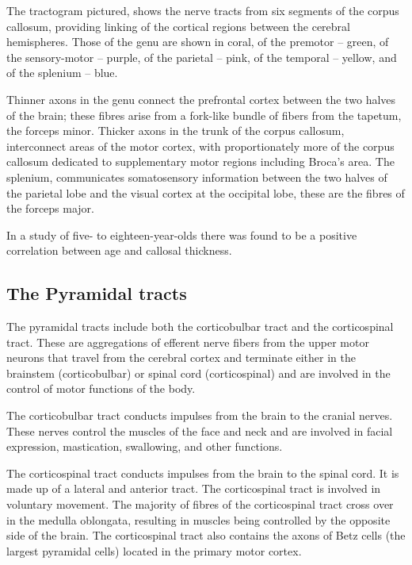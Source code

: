 \documentclass[]{book}
\begin{document}
The tractogram pictured, shows the nerve tracts from six segments of the corpus callosum, providing linking of the cortical regions between the cerebral hemispheres. Those of the genu are shown in coral, of the premotor -- green, of the sensory-motor -- purple, of the parietal -- pink, of the temporal -- yellow, and of the splenium -- blue.

Thinner axons in the genu connect the prefrontal cortex between the two halves of the brain; these fibres arise from a fork-like bundle of fibers from the tapetum, the forceps minor. Thicker axons in the trunk of the corpus callosum, interconnect areas of the motor cortex, with proportionately more of the corpus callosum dedicated to supplementary motor regions including Broca's area. The splenium, communicates somatosensory information between the two halves of the parietal lobe and the visual cortex at the occipital lobe, these are the fibres of the forceps major.

In a study of five- to eighteen-year-olds there was found to be a positive correlation between age and callosal thickness.

\hypertarget{the-pyramidal-tracts}{%
\subsection{The Pyramidal tracts}\label{the-pyramidal-tracts}}

The pyramidal tracts include both the corticobulbar tract and the corticospinal tract. These are aggregations of efferent nerve fibers from the upper motor neurons that travel from the cerebral cortex and terminate either in the brainstem (corticobulbar) or spinal cord (corticospinal) and are involved in the control of motor functions of the body.

The corticobulbar tract conducts impulses from the brain to the cranial nerves. These nerves control the muscles of the face and neck and are involved in facial expression, mastication, swallowing, and other functions.

The corticospinal tract conducts impulses from the brain to the spinal cord. It is made up of a lateral and anterior tract. The corticospinal tract is involved in voluntary movement. The majority of fibres of the corticospinal tract cross over in the medulla oblongata, resulting in muscles being controlled by the opposite side of the brain. The corticospinal tract also contains the axons of Betz cells (the largest pyramidal cells) located in the primary motor cortex.
\end{document}
